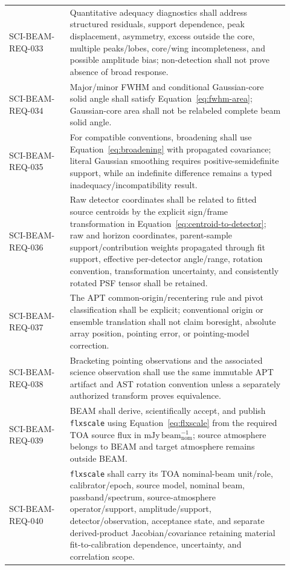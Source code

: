 \begin{longtable}{>{\raggedright\arraybackslash\ttfamily\scriptsize}p{0.20\linewidth}L{0.72\linewidth}}
SCI-BEAM-REQ-033 & Quantitative adequacy diagnostics shall address structured residuals, support dependence, peak displacement, asymmetry, excess outside the core, multiple peaks/lobes, core/wing incompleteness, and possible amplitude bias; non-detection shall not prove absence of broad response. \\
SCI-BEAM-REQ-034 & Major/minor FWHM and conditional Gaussian-core solid angle shall satisfy Equation~\ref{eq:fwhm-area}; Gaussian-core area shall not be relabeled complete beam solid angle. \\
SCI-BEAM-REQ-035 & For compatible conventions, broadening shall use Equation~\ref{eq:broadening} with propagated covariance; literal Gaussian smoothing requires positive-semidefinite support, while an indefinite difference remains a typed inadequacy/incompatibility result. \\
SCI-BEAM-REQ-036 & Raw detector coordinates shall be related to fitted source centroids by the explicit sign/frame transformation in Equation~\ref{eq:centroid-to-detector}; raw and horizon coordinates, parent-sample support/contribution weights propagated through fit support, effective per-detector angle/range, rotation convention, transformation uncertainty, and consistently rotated PSF tensor shall be retained. \\
SCI-BEAM-REQ-037 & The APT common-origin/recentering rule and pivot classification shall be explicit; conventional origin or ensemble translation shall not claim boresight, absolute array position, pointing error, or pointing-model correction. \\
SCI-BEAM-REQ-038 & Bracketing pointing observations and the associated science observation shall use the same immutable APT artifact and AST rotation convention unless a separately authorized transform proves equivalence. \\
SCI-BEAM-REQ-039 & BEAM shall derive, scientifically accept, and publish \texttt{flxscale} using Equation~\ref{eq:flxscale} from the required TOA source flux in $\mathrm{mJy\,beam_{nom}^{-1}}$; source atmosphere belongs to BEAM and target atmosphere remains outside BEAM. \\
SCI-BEAM-REQ-040 & \texttt{flxscale} shall carry its TOA nominal-beam unit/role, calibrator/epoch, source model, nominal beam, passband/spectrum, source-atmosphere operator/support, amplitude/support, detector/observation, acceptance state, and separate derived-product Jacobian/covariance retaining material fit-to-calibration dependence, uncertainty, and correlation scope. \\

\end{longtable}
